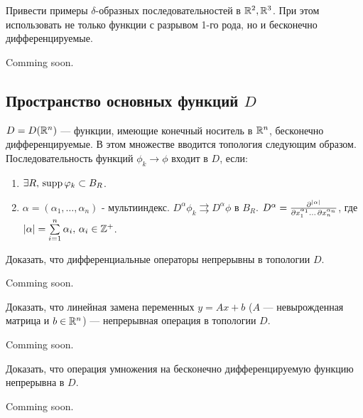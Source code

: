 \begin{task}
	Привести примеры $\delta$-образных последовательностей в $\mathbb{R}^2, \mathbb{R}^3$. При этом использовать не только функции с разрывом 1-го рода, но и бесконечно дифференцируемые.
\end{task}

\begin{solution}
	Comming soon.
\end{solution}


\subsection{Пространство основных функций $D$}


$D = D(\mathbb{R}^n)$ --- функции, имеющие конечный носитель в $\mathbb{R}^n$, бесконечно дифференцируемые. В этом множестве вводится топология следующим образом. Последовательность функций $\phi_k \to \phi$ входит в $D$, если:
\begin{enumerate}
	\item $\exists R, \, \operatorname{supp} \varphi_k \subset B_R$.
	\item $\alpha = (\alpha_1, \dots, \alpha_n)$ - мультииндекс. $D^{\alpha}\phi_k \rightrightarrows D^{\alpha}\phi$ в $B_R$. $D^{\alpha} = \frac{ \partial^{\left| \alpha \right|} }{\partial x_1^{\alpha_1} \dots \, \partial x_n^{\alpha_n}}$, где $\left| \alpha \right| = \sum\limits_{i=1}^n \alpha_i, \,\alpha_i \in \mathbb{Z}^+$.
\end{enumerate}


\begin{task}
	Доказать, что дифференциальные операторы непрерывны в топологии $D$.
\end{task}


\begin{solution}

	Comming soon.
\end{solution}


\begin{task}
	Доказать, что линейная замена переменных $y = Ax+b$ ($A$ --- невырожденная матрица и $b \in \mathbb{R}^n$) --- непрерывная операция в топологии $D$.
\end{task}


\begin{solution}

	Comming soon.
\end{solution}


\begin{task}
	Доказать, что операция умножения на бесконечно дифференцируемую функцию непрерывна в $D$.
\end{task}


\begin{solution}

	Comming soon.
\end{solution}